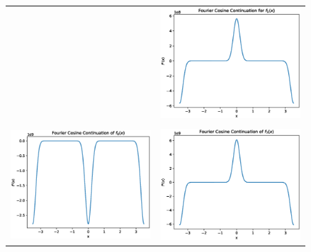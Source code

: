 \documentclass[11pt]{amsart}
\begin{document}
\begin{figure}
\begin{tabular}{|c|c|}
& 
\includegraphics[scale=.4]{f_5Cosine.eps}
\\ \\
\hline
\includegraphics[scale=.4]{f_6Cosine.eps}
& 
\includegraphics[scale=.4]{f_7Cosine.eps}

\end{tabular}
\end{figure}
\end{document}
